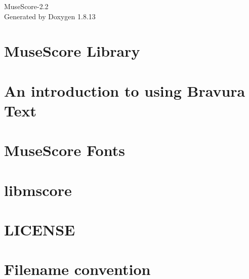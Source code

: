 \documentclass[twoside]{book}
\newcommand{\+}{\discretionary{\mbox{\scriptsize$\hookleftarrow$}}{}{}}
\newcommand{\clearemptydoublepage}{%
  \newpage{\pagestyle{empty}\cleardoublepage}%
}
\begin{document}
\hypersetup{pageanchor=false,
             bookmarksnumbered=true,
             pdfencoding=unicode
            }
\begin{titlepage}
\vspace*{7cm}
\begin{center}%
{\Large Muse\+Score-\/2.2 }\\
\vspace*{1cm}
{\large Generated by Doxygen 1.8.13}\\
\end{center}
\end{titlepage}
\clearemptydoublepage
{}
\tableofcontents
\clearemptydoublepage
{}
\hypersetup{pageanchor=true}

\chapter{Muse\+Score Library}
\label{index}\hypertarget{index}{}
\chapter{An introduction to using Bravura Text}
\label{md_fonts_bravura_bravura-text}

\chapter{Muse\+Score Fonts}
\label{md_fonts__r_e_a_d_m_e}

\chapter{libmscore}
\label{md_libmscore__r_e_a_d_m_e}

\chapter{L\+I\+C\+E\+N\+SE}
\label{md_mscore_data_icons__l_i_c_e_n_s_e}

\chapter{Filename convention}
\label{md_mtest_libmscore_parts__r_e_a_d_m_e}

\end{document}
